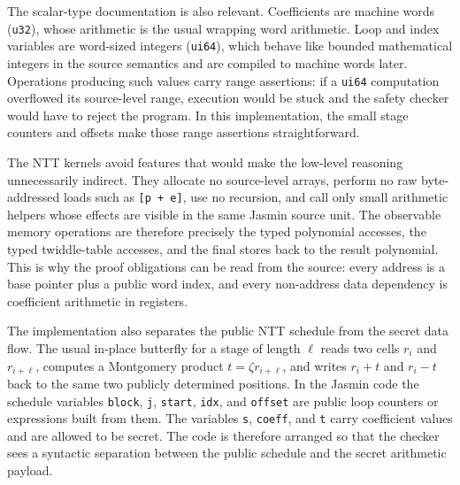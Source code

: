 \documentclass[10pt,twocolumn]{article}
\newcommand{\jasmin}{Jasmin}
\begin{document}
The scalar-type documentation is also relevant.  Coefficients are machine words
(\texttt{u32}), whose arithmetic is the usual wrapping word arithmetic.  Loop
and index variables are word-sized integers (\texttt{ui64}), which behave like
bounded mathematical integers in the source semantics and are compiled to
machine words later.  Operations producing such values carry range assertions:
if a \texttt{ui64} computation overflowed its source-level range, execution
would be stuck and the safety checker would have to reject the program.  In this
implementation, the small stage counters and offsets make those range
assertions straightforward.

The NTT kernels avoid features that would make the low-level reasoning
unnecessarily indirect.  They allocate no source-level arrays, perform no raw
byte-addressed loads such as \texttt{[p + e]}, use no recursion, and call only
small arithmetic helpers whose effects are visible in the same \jasmin{} source
unit.  The observable memory operations are therefore precisely the typed
polynomial accesses, the typed twiddle-table accesses, and the final stores
back to the result polynomial.  This is why the proof obligations can be read
from the source: every address is a base pointer plus a public word index, and
every non-address data dependency is coefficient arithmetic in registers.

The implementation also separates the public NTT schedule from the secret data
flow.  The usual in-place butterfly for a stage of length \(\ell\) reads two
cells \(r_i\) and \(r_{i+\ell}\), computes a Montgomery product
\(t=\zeta r_{i+\ell}\), and writes \(r_i+t\) and \(r_i-t\) back to the same two
publicly determined positions.  In the \jasmin{} code the schedule variables
\texttt{block}, \texttt{j}, \texttt{start}, \texttt{idx}, and
\texttt{offset} are public loop counters or expressions built from them.  The
variables \texttt{s}, \texttt{coeff}, and \texttt{t} carry coefficient values
and are allowed to be secret.  The code is therefore arranged so that the
checker sees a syntactic separation between the public schedule and the secret
arithmetic payload.
\end{document}
